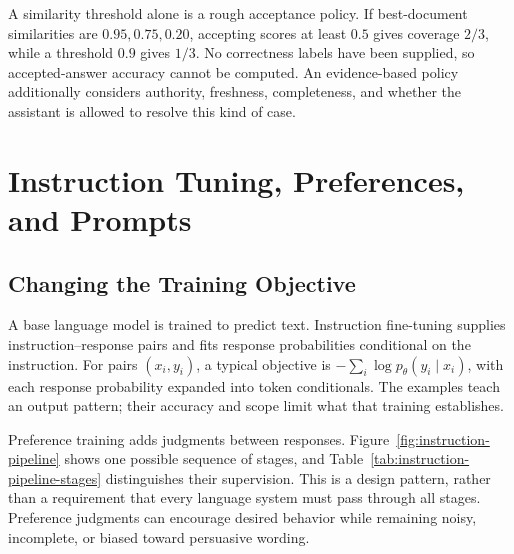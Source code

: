 A similarity threshold alone is a rough acceptance policy. If best-document similarities are $0.95,0.75,0.20$, accepting scores at least $0.5$ gives coverage $2/3$, while a threshold $0.9$ gives $1/3$. No correctness labels have been supplied, so accepted-answer accuracy cannot be computed. An evidence-based policy additionally considers authority, freshness, completeness, and whether the assistant is allowed to resolve this kind of case.

\section{Instruction Tuning, Preferences, and Prompts}

\subsection{Changing the Training Objective}

A base language model is trained to predict text. Instruction fine-tuning supplies instruction--response pairs and fits response probabilities conditional on the instruction. For pairs $(x_i,y_i)$, a typical objective is $-\sum_i\log p_\theta(y_i\mid x_i)$, with each response probability expanded into token conditionals. The examples teach an output pattern; their accuracy and scope limit what that training establishes.

Preference training adds judgments between responses. Figure~\ref{fig:instruction-pipeline} shows one possible sequence of stages, and Table~\ref{tab:instruction-pipeline-stages} distinguishes their supervision. This is a design pattern, rather than a requirement that every language system must pass through all stages. Preference judgments can encourage desired behavior while remaining noisy, incomplete, or biased toward persuasive wording.

\par\addvspace{\intextsep}\noindent\begin{minipage}{\linewidth}
\centering
{}
\label{fig:instruction-pipeline}
\end{minipage}\par\addvspace{\intextsep}


